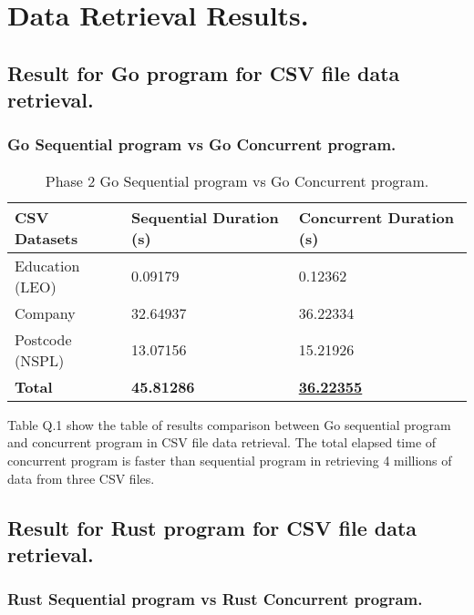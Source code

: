 \chapter{Data Retrieval Results.} 
\label{AppendixQ} 


\section{Result for Go program for CSV file data retrieval.}

\subsection{Go Sequential program vs Go Concurrent program.}

\begin{table}[H]
	\centering
	\begin{tabulary}{1.0\textwidth}{|L|L|L|}
		\hline
		{\bf{CSV Datasets}} & {\bf Sequential Duration (s)} & {\bf Concurrent Duration (s)}  \\ \hline
		Education (LEO)		& 0.09179      			  		& 0.12362                    	 \\ \hline
		Company				& 32.64937    					& 36.22334                       \\ \hline
		Postcode (NSPL) 	& 13.07156       				& 15.21926                       \\ \hline
		\bf{Total}   		& \textbf{45.81286}  			& \bf{\underline{36.22355}}       \\ \hline
	\end{tabulary}
	\caption{Phase 2 Go Sequential program vs Go Concurrent program.}
\end{table}

Table Q.1 show the table of results comparison between Go sequential program and concurrent program in CSV file data retrieval. The total elapsed time of concurrent program is faster than sequential program in retrieving 4 millions of data from three CSV files.

\newpage  

\section{Result for Rust program for CSV file data retrieval.}

\subsection{Rust Sequential program vs Rust Concurrent program.}

